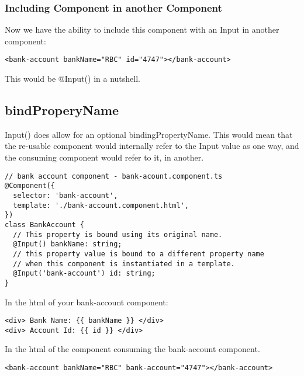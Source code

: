 
\subsubsection{ Including Component in another Component }
Now we have the ability to include this component with an Input in another
component:
\begin{lstlisting}
<bank-account bankName="RBC" id="4747"></bank-account>
\end{lstlisting}

This would be @Input() in a nutshell.

\subsection{ bindProperyName }
Input() does allow for an optional bindingPropertyName. This would mean that
the re-usable component would internally refer to the Input value as one way,
and the consuming component would refer to it, in another.

\begin{lstlisting}
// bank account component - bank-acount.component.ts
@Component({
  selector: 'bank-account',
  template: './bank-account.component.html',
})
class BankAccount {
  // This property is bound using its original name.
  @Input() bankName: string;
  // this property value is bound to a different property name
  // when this component is instantiated in a template.
  @Input('bank-account') id: string;
}
\end{lstlisting}

In the html of your bank-account component:
\begin{lstlisting}
<div> Bank Name: {{ bankName }} </div>
<div> Account Id: {{ id }} </div>
\end{lstlisting}

In the html of the component consuming the bank-account component.
\begin{lstlisting}
<bank-account bankName="RBC" bank-account="4747"></bank-account>
\end{lstlisting}

